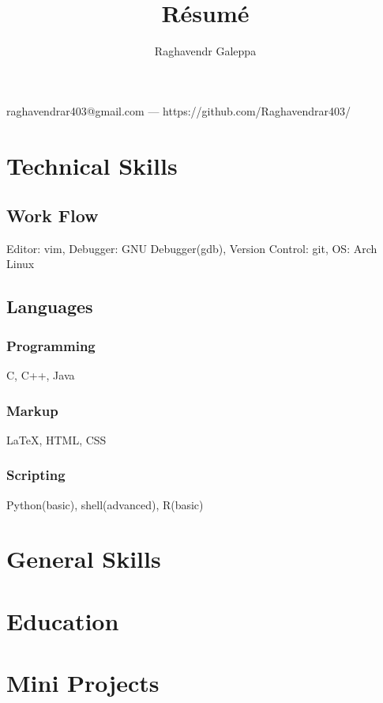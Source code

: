 \documentclass{article}
\makeatletter
\renewcommand{\maketitle}{
\begin{center} 
{\huge\bfseries
\theauthor}

raghavendrar403@gmail.com --- https://github.com/Raghavendrar403/

\end{center}

}
\makeatother
\begin{document}
\title{R\'esum\'e}
\author{Raghavendr Galeppa}

\maketitle

\section{Technical Skills}

\subsection{Work Flow}

Editor: vim, Debugger: GNU Debugger(gdb), Version Control: git, OS: Arch Linux

\subsection{Languages}

\subsubsection{Programming}

C, C++, Java

\subsubsection{Markup}

{\LaTeX}, HTML, CSS

\subsubsection{Scripting}

Python(basic), shell(advanced), R(basic)

\section{General Skills}

\section{Education}

\section{Mini Projects}
\end{document}
